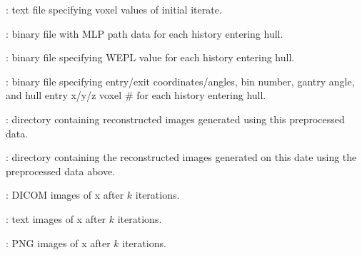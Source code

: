 \documentclass[landscape,12pt]{article}
\begin{document}
\begin{myEnumerate}[labelindent=1pt, leftmargin=*]
\begin{myEnumerate}[labelindent=1pt, leftmargin=*]
\begin{myEnumerate}[labelindent=1pt, leftmargin=*]
\begin{myEnumerate}[labelindent=1pt, leftmargin=*]
\begin{myEnumerate}[labelindent=1pt, leftmargin=*]
\begin{myEnumerate}[labelindent=1pt, leftmargin=*]
\begin{myEnumerate}[labelindent=1pt, leftmargin=*]
\begin{myEnumerate}[labelindent=1pt, leftmargin=*]
\begin{myEnumerate}[labelindent=1pt, leftmargin=*]
                                        \item {} \color{Black}: text file specifying voxel values of initial iterate.
                                        \item {} \color{Black}: binary file with MLP path data for each history entering hull.
                                        \item {} \color{Black}: binary file specifying WEPL value for each history entering hull.
                                        \item {} \color{Black}: binary file specifying entry/exit coordinates/angles, bin number, gantry angle, and hull entry x/y/z voxel \# for each history entering hull.
                                        \item {} \color{Black}: directory containing reconstructed images generated using this preprocessed data.
                                        \begin{myEnumerate}[labelindent=1pt, leftmargin=*]
                                            \item {} \color{Black}: directory containing the reconstructed images generated on this date using the preprocessed data above.
                                                \begin{myEnumerate}[labelindent=1pt, leftmargin=*]
                                                    \item {} \color{Black}: DICOM images of x after $k$ iterations.
                                                    \item {} \color{Black}: text images of x after $k$ iterations.
                                                    \item {} \color{Black}: PNG images of x after $k$ iterations.
                                                \end{myEnumerate}
                                        \end{myEnumerate}
                                    \end{myEnumerate}
                                \end{myEnumerate}

\end{myEnumerate}
\end{myEnumerate}
\end{myEnumerate}
\end{myEnumerate}
\end{myEnumerate}
\end{myEnumerate}
\end{myEnumerate}
\end{document}
